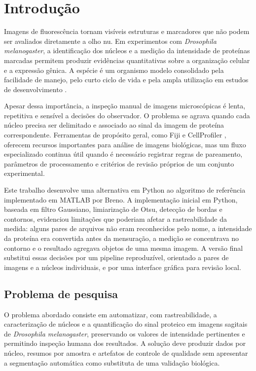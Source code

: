 \chapter{Introdução}
\label{cap:introducao}

Imagens de fluorescência tornam visíveis estruturas e marcadores que não podem ser avaliados diretamente a olho nu. Em experimentos com \textit{Drosophila melanogaster}, a identificação dos núcleos e a medição da intensidade de proteínas marcadas permitem produzir evidências quantitativas sobre a organização celular e a expressão gênica. A espécie é um organismo modelo consolidado pela facilidade de manejo, pelo curto ciclo de vida e pela ampla utilização em estudos de desenvolvimento \cite{Roberts2006}.

Apesar dessa importância, a inspeção manual de imagens microscópicas é lenta, repetitiva e sensível a decisões do observador. O problema se agrava quando cada núcleo precisa ser delimitado e associado ao sinal da imagem de proteína correspondente. Ferramentas de propósito geral, como Fiji \cite{Schindelin2012} e CellProfiler \cite{Carpenter2006}, oferecem recursos importantes para análise de imagens biológicas, mas um fluxo especializado continua útil quando é necessário registrar regras de pareamento, parâmetros de processamento e critérios de revisão próprios de um conjunto experimental.

Este trabalho desenvolve uma alternativa em Python ao algoritmo de referência implementado em MATLAB por Breno. A implementação inicial em Python, baseada em filtro Gaussiano, limiarização de Otsu, detecção de bordas e contornos, evidenciou limitações que poderiam afetar a rastreabilidade da medida: alguns pares de arquivos não eram reconhecidos pelo nome, a intensidade da proteína era convertida antes da mensuração, a medição se concentrava no contorno e o resultado agregava objetos de uma mesma imagem. A versão final substitui essas decisões por um pipeline reproduzível, orientado a pares de imagens e a núcleos individuais, e por uma interface gráfica para revisão local.

\section{Problema de pesquisa}

O problema abordado consiste em automatizar, com rastreabilidade, a caracterização de núcleos e a quantificação do sinal proteico em imagens sagitais de \textit{Drosophila melanogaster}, preservando os valores de intensidade pertinentes e permitindo inspeção humana dos resultados. A solução deve produzir dados por núcleo, resumos por amostra e artefatos de controle de qualidade sem apresentar a segmentação automática como substituta de uma validação biológica.

